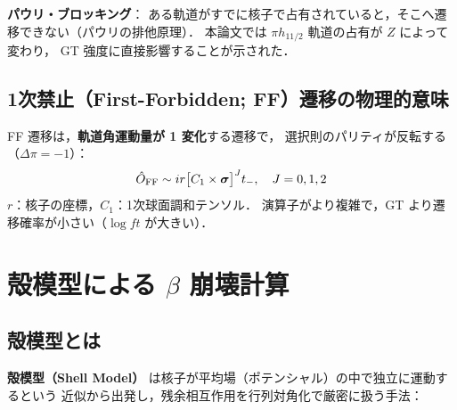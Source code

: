 \documentclass[12pt,a4paper]{ltjsarticle}
\begin{document}
\begin{point}
\textbf{パウリ・ブロッキング}：
ある軌道がすでに核子で占有されていると，そこへ遷移できない（パウリの排他原理）．
本論文では $\pi h_{11/2}$ 軌道の占有が $Z$ によって変わり，
GT 強度に直接影響することが示された．
\end{point}

\subsection{1次禁止（First-Forbidden; FF）遷移の物理的意味}

FF 遷移は，\textbf{軌道角運動量が 1 変化}する遷移で，
選択則のパリティが反転する（$\Delta\pi = -1$）：
\begin{equation}
  \hat{O}_{\rm FF} \sim i r \bigl[C_1 \times \bm{\sigma}\bigr]^J t_-, \quad J = 0, 1, 2
\end{equation}
$r$：核子の座標，$C_1$：1次球面調和テンソル．
演算子がより複雑で，GT より遷移確率が小さい（$\log ft$ が大きい）．

\section{殻模型による $\beta$ 崩壊計算}

\subsection{殻模型とは}

\textbf{殻模型（Shell Model）} は核子が平均場（ポテンシャル）の中で独立に運動するという
近似から出発し，残余相互作用を行列対角化で厳密に扱う手法：

\begin{center}
\end{center}
\end{document}
